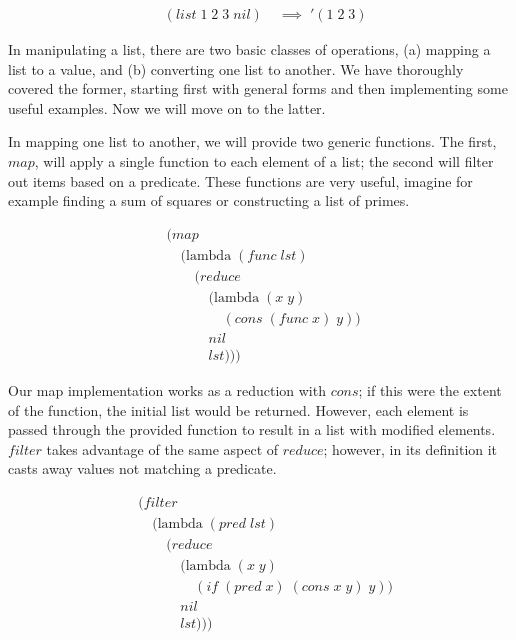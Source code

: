 \begin{figure}[ht]
\caption{}\label{scheme}
\begin{align*}
& (list \; 1 \; 2 \; 3 \; nil) \; &\implies \; '(1 \; 2 \; 3)
\end{align*}
\end{figure}

In manipulating a list, there are two basic classes of operations, (a) mapping a 
list to a value, and (b) converting one list to another. We have thoroughly 
covered the former, starting first with general forms and then implementing some 
useful examples. Now we will move on to the latter.

In mapping one list to another, we will provide two generic functions. The first, 
$map$, will apply a single function to each element of a list; the second will 
filter out items based on a predicate. These functions are very useful, imagine 
for example finding a sum of squares or constructing a list of primes.

\begin{figure}[ht]
\caption{}\label{scheme}
\begin{align*}
& (map \; 
\\& \quad (\text{lambda} \; (func \; lst)
\\& \qquad (reduce
\\& \qquad \quad (\text{lambda} \; (x \; y) \; 
\\& \qquad \qquad (cons \; (func \; x) \; y)) \; 
\\& \qquad \quad nil
\\& \qquad \quad lst)))
\end{align*}
\end{figure}

Our map implementation works as a reduction with $cons$; if this were the extent 
of the function, the initial list would be returned. However, each element is 
passed through the provided function to result in a list with modified elements. 
$filter$ takes advantage of the same aspect of $reduce$; however, in its 
definition it casts away values not matching a predicate.

\begin{figure}[ht]
\caption{}\label{scheme}
\begin{align*}
& (filter \; 
\\& \quad (\text{lambda} \; (pred \; lst)
\\& \qquad (reduce
\\& \qquad \quad (\text{lambda} \; (x \; y)
\\& \qquad \qquad (if \; (pred \; x) \; (cons \; x \; y) \; y))
\\& \qquad \quad nil
\\& \qquad \quad lst)))
\end{align*}
\end{figure}

